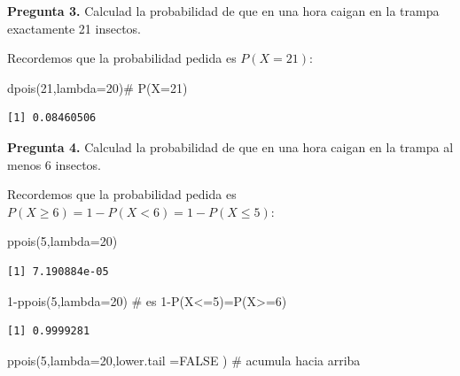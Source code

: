 \documentclass[
  letterpaper,
  DIV=11,
  numbers=noendperiod]{scrreprt}
\newenvironment{Shaded}{\begin{snugshade}}{\end{snugshade}}
\newcommand{\AttributeTok}[1]{\textcolor[rgb]{0.40,0.45,0.13}{#1}}
\newcommand{\CommentTok}[1]{\textcolor[rgb]{0.37,0.37,0.37}{#1}}
\newcommand{\ConstantTok}[1]{\textcolor[rgb]{0.56,0.35,0.01}{#1}}
\newcommand{\DecValTok}[1]{\textcolor[rgb]{0.68,0.00,0.00}{#1}}
\newcommand{\FunctionTok}[1]{\textcolor[rgb]{0.28,0.35,0.67}{#1}}
\newcommand{\NormalTok}[1]{\textcolor[rgb]{0.00,0.23,0.31}{#1}}
\newcommand{\SpecialCharTok}[1]{\textcolor[rgb]{0.37,0.37,0.37}{#1}}
\begin{document}
\textbf{Pregunta 3.} Calculad la probabilidad de que en una hora caigan
en la trampa exactamente 21 insectos.

Recordemos que la probabilidad pedida es \(P(X=21)\):

\begin{Shaded}
\begin{Highlighting}[]
\FunctionTok{dpois}\NormalTok{(}\DecValTok{21}\NormalTok{,}\AttributeTok{lambda=}\DecValTok{20}\NormalTok{)}\CommentTok{\# P(X=21)}
\end{Highlighting}
\end{Shaded}

\begin{verbatim}
[1] 0.08460506
\end{verbatim}

\textbf{Pregunta 4.} Calculad la probabilidad de que en una hora caigan
en la trampa al menos 6 insectos.

Recordemos que la probabilidad pedida es
\(P(X\geq 6)=1-P(X<6)=1-P(X\leq 5)\):

\begin{Shaded}
\begin{Highlighting}[]
\FunctionTok{ppois}\NormalTok{(}\DecValTok{5}\NormalTok{,}\AttributeTok{lambda=}\DecValTok{20}\NormalTok{)}
\end{Highlighting}
\end{Shaded}

\begin{verbatim}
[1] 7.190884e-05
\end{verbatim}

\begin{Shaded}
\begin{Highlighting}[]
\DecValTok{1}\SpecialCharTok{{-}}\FunctionTok{ppois}\NormalTok{(}\DecValTok{5}\NormalTok{,}\AttributeTok{lambda=}\DecValTok{20}\NormalTok{) }\CommentTok{\# es 1{-}P(X\textless{}=5)=P(X\textgreater{}=6)}
\end{Highlighting}
\end{Shaded}

\begin{verbatim}
[1] 0.9999281
\end{verbatim}

\begin{Shaded}
\begin{Highlighting}[]
\FunctionTok{ppois}\NormalTok{(}\DecValTok{5}\NormalTok{,}\AttributeTok{lambda=}\DecValTok{20}\NormalTok{,}\AttributeTok{lower.tail =}\ConstantTok{FALSE}\NormalTok{ ) }\CommentTok{\# acumula hacia arriba }
\end{Highlighting}
\end{Shaded}
\end{document}
